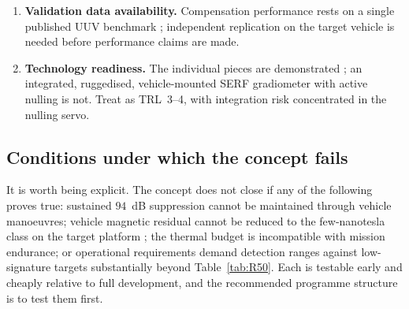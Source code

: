 \documentclass[11pt]{article}
\begin{document}
\begin{enumerate}[leftmargin=1.5em]
intrinsically calibrated \cite{budker2007}, the surrounding chain --- coil
constants, axis alignment, compensation coefficients --- is not. Compensation
manoeuvres are needed to condition the Tolles--Lawson fit
\cite{leliak1961,leach1980}, and these consume mission time.
\item \textbf{Validation data availability.} Compensation performance rests on a
single published UUV benchmark \cite{oehler2024}; independent replication on the
target vehicle is needed before performance claims are made.
\item \textbf{Technology readiness.} The individual pieces are demonstrated
\cite{griffith2010,oehler2024,fang2012}; an integrated, ruggedised,
vehicle-mounted SERF gradiometer with active nulling is not. Treat as TRL~3--4,
with integration risk concentrated in the nulling servo.
\end{enumerate}

\subsection{Conditions under which the concept fails}
It is worth being explicit. The concept does not close if any of the following
proves true: sustained $94$~dB suppression cannot be maintained through vehicle
manoeuvres; vehicle magnetic residual cannot be reduced to the few-nanotesla class
on the target platform \cite{oehler2024}; the thermal budget is incompatible with
mission endurance; or operational requirements demand detection ranges against
low-signature targets substantially beyond Table~\ref{tab:R50}. Each is testable
early and cheaply relative to full development, and the recommended programme
structure is to test them first.
\end{document}
